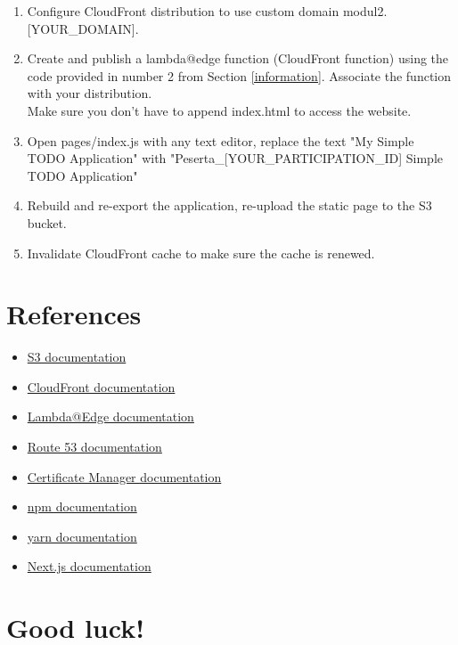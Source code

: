 \documentclass{article}
\begin{document}
\begin{enumerate}
    \item Configure CloudFront distribution to use custom domain modul2.[YOUR\_DOMAIN].
    \item Create and publish a lambda@edge function (CloudFront function) using the code provided in number 2 from Section \ref{information}. Associate the function with your distribution.\\
    Make sure you don't have to append index.html to access the website.
    \item Open pages/index.js with any text editor, replace the text "My Simple TODO Application" with "Peserta\_[YOUR\_PARTICIPATION\_ID] Simple TODO Application"
    \item Rebuild and re-export the application, re-upload the static page to the S3 bucket.
    \item Invalidate CloudFront cache to make sure the cache is renewed.
\end{enumerate}

\section{References}\label{references}

\begin{itemize}
    \item \href{https://docs.aws.amazon.com/AmazonS3/latest/userguide/Welcome.html}{S3 documentation}
    \item \href{https://docs.aws.amazon.com/AmazonCloudFront/latest/DeveloperGuide/Introduction.html}{CloudFront documentation}
    \item \href{https://docs.aws.amazon.com/AmazonCloudFront/latest/DeveloperGuide/lambda-at-the-edge.html}{Lambda@Edge documentation}
    \item \href{https://docs.aws.amazon.com/Route53/latest/DeveloperGuide/Welcome.html}{Route 53 documentation}
    \item \href{https://docs.aws.amazon.com/acm/latest/userguide/acm-overview.html}{Certificate Manager documentation}
    \item \href{https://docs.npmjs.com/cli/v8/commands}{npm documentation}
    \item \href{https://classic.yarnpkg.com/en/docs}{yarn documentation}
    \item \href{https://nextjs.org/docs/deployment}{Next.js documentation}
\end{itemize}

\section*{Good luck!}
\end{document}
